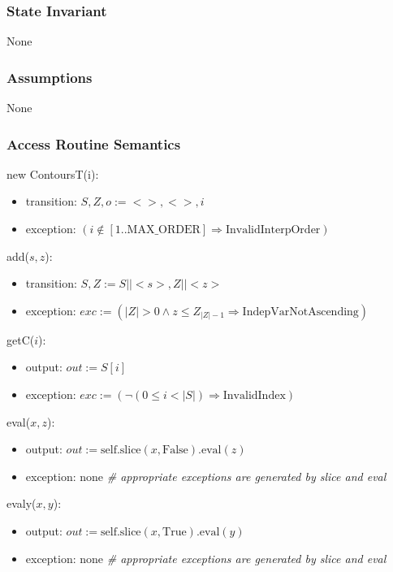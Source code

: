 \documentclass[12pt, titlepage]{article}
\begin{document}
\subsubsection {State Invariant}

None

\subsubsection {Assumptions}

None

\subsubsection {Access Routine Semantics}

new ContoursT(i):
\begin{itemize}
\item transition: $S, Z, o := < >, <>, i$
\item exception: $(i \notin [1..\mbox{MAX\_ORDER}] \Rightarrow \mbox{InvalidInterpOrder})$

\end{itemize}

\noindent add($s, z$):
\begin{itemize}
\item transition: $S, Z := S || <s>, Z || <z>$
\item exception: $exc := (|Z| > 0 \wedge z
  \leq Z_{|Z|-1} \Rightarrow \mbox{IndepVarNotAscending})$
\end{itemize}

\noindent getC($i$):
\begin{itemize}
\item output: $out := S[i]$
\item exception: $exc := (\neg(0 \leq i < |S|) \Rightarrow \mbox{InvalidIndex})$
\end{itemize}

\noindent eval($x, z$):
\begin{itemize}
\item output: $out := \mbox{self.slice}(x, \text{False}).\mbox{eval}(z)$
\item exception: none \textit{\# appropriate exceptions are generated by slice
    and eval}
\end{itemize}

\noindent evaly($x, y$):
\begin{itemize}
\item output: $out := \mbox{self.slice}(x, \text{True}).\mbox{eval}(y)$
\item exception: none \textit{\# appropriate exceptions are generated by slice
    and eval}
\end{itemize}
\end{document}
